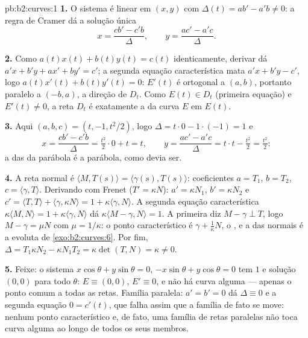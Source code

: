 \begin{solution}{pb:b2:curves:1}
\textbf{1.} O sistema é linear em $(x, y)$ com 
$\Delta(t) = a b' - a'b \neq 0$: a regra de Cramer dá a
solução única
\[
x = \frac{c b' - c' b}{\Delta}, \qquad
y = \frac{a c' - a' c}{\Delta}.
\]

\textbf{2.} Como $a(t)x(t) + b(t)y(t) = c(t)$ identicamente,
derivar dá $a'x + b'y + ax' + by' = c'$; a
segunda equação característica mata $a'x + b'y - c'$, logo
$a(t)x'(t) + b(t)y'(t) = 0$: $E'(t)$ é ortogonal a $(a,
b)$, portanto paralelo a $(-b, a)$, a direção de $D_t$. Como
$E(t) \in D_t$ (primeira equação) e $E'(t) \neq 0$, a reta
$D_t$ é exatamente a  da curva $E$ em $E(t)$.

\textbf{3.} Aqui $(a, b, c) = (t, -1, t^2/2)$, logo $\Delta =
t\cdot0 - 1\cdot(-1) = 1$ e
\[
x = \frac{c b' - c' b}{\Delta} = \tfrac{t^2}2\cdot 0 +
t = t, \qquad
y = \frac{a c' - a' c}{\Delta} = t\cdot t - \tfrac{t^2}2 =
\tfrac{t^2}2 :
\]
a  das  da parábola é a
parábola, como devia ser.

\textbf{4.} A reta normal é $\langle M, T(s)\rangle =
\langle\gamma(s), T(s)\rangle$: coeficientes $a = T_1$, $b =
T_2$, $c = \langle\gamma, T\rangle$. Derivando com
Frenet ($T' = \kappa N$): $a' = \kappa N_1$, $b' = \kappa
N_2$ e $c' = \langle T, T\rangle + \langle\gamma, \kappa
N\rangle = 1 + \kappa\langle\gamma, N\rangle$. A segunda
equação característica $\kappa\langle M, N\rangle = 1 +
\kappa\langle\gamma, N\rangle$ dá $\kappa\langle M -
\gamma, N\rangle = 1$. A primeira diz $M - \gamma \perp T$,
logo $M - \gamma = \mu N$ com $\mu = 1/\kappa$: o
ponto característico é $\gamma + \frac1\kappa N$, o , e a  das normais é a evoluta
de \cref{exo:b2:curves:6}. Por fim, $\Delta = T_1\kappa N_2 -
\kappa N_1 T_2 = \kappa\det(T, N) = \kappa \neq 0$.

\textbf{5.} Feixe: o sistema $x\cos\theta + y\sin\theta =
0$, $-x\sin\theta + y\cos\theta = 0$ tem  $1$ e
solução $(0,0)$ para todo $\theta$: $E \equiv (0,0)$, $E'
\equiv 0$, e não há curva alguma --- apenas o ponto comum
a todas as retas. Família paralela: $a' = b' = 0$ dá
$\Delta \equiv 0$ e a segunda equação $0 = c'(t)$, que
falha assim que a família de fato se move: nenhum ponto
característico e, de fato, uma família de retas paralelas não toca
curva alguma ao longo de todos os seus membros.


\end{solution}
